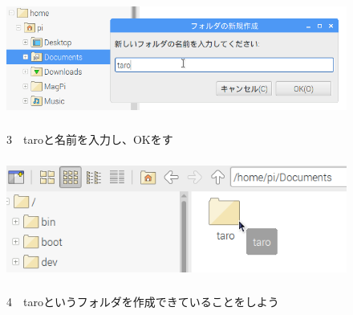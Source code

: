 \documentclass[a4paper,12pt]{jarticle}
\begin{document}
\begin{figure}[ht]
  \centering
  \includegraphics[width=12.776cm,height=3.879cm]{textbook-img039.png}
  \begin{minipage}{\textwidth}
    3　taroと名前を入力し、OKをす
  \end{minipage}

  \centering
  \includegraphics[width=12.659cm,height=3.972cm]{textbook-img040.png}
  \begin{minipage}{\textwidth}
    4　taroというフォルダを作成できていることをしよう
  \end{minipage}

\end{figure}
\clearpage
\end{document}
